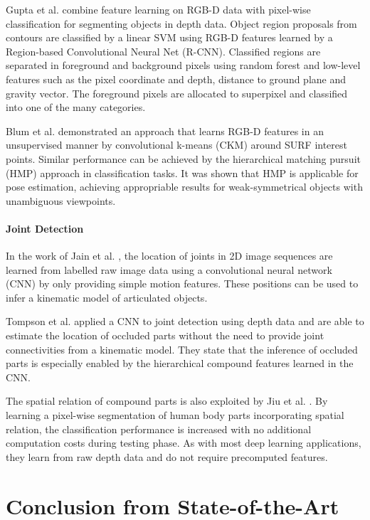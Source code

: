 Gupta et al. \cite{Gupta2014} combine feature learning on RGB-D data with pixel-wise classification for segmenting objects in depth data. Object region proposals from contours are classified by a linear SVM using RGB-D features learned by a Region-based Convolutional Neural Net (R-CNN). Classified regions are separated in foreground and background pixels using random forest and low-level features such as the pixel coordinate and depth, distance to ground plane and gravity vector. The foreground pixels are allocated to superpixel and classified into one of the many categories.

Blum et al. \cite{Blum2012} demonstrated an approach that learns RGB-D features in an unsupervised manner by convolutional k-means (CKM) around SURF interest points. Similar performance can be achieved by the hierarchical matching pursuit (HMP) approach \cite{Bo2013} in classification tasks. It was shown that HMP is applicable for pose estimation, achieving appropriable results for weak-symmetrical objects with unambiguous viewpoints.

\paragraph{Joint Detection}
In the work of Jain et al. \cite{Jain2015}, the location of joints in 2D image sequences are learned from labelled raw image data using a convolutional neural network (CNN) by only providing simple motion features. These positions can be used to infer a kinematic model of articulated objects.

Tompson et al. \cite{Tompson2014} applied a CNN to joint detection using depth data and are able to estimate the location of occluded parts without the need to provide joint connectivities from a kinematic model. They state that the inference of occluded parts is especially enabled by the hierarchical compound features learned in the CNN.

The spatial relation of compound parts is also exploited by Jiu et al. \cite{Jiu2014}. By learning a pixel-wise segmentation of human body parts incorporating spatial relation, the classification performance is increased with no additional computation costs during testing phase. As with most deep learning applications, they learn from raw depth data and do not require precomputed features.



\section{Conclusion from State-of-the-Art}
\label{sec:discussion}

